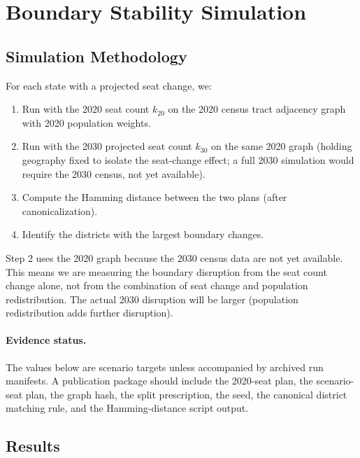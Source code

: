 \section{Boundary Stability Simulation}
\label{sec:boundary}

\subsection{Simulation Methodology}

For each state with a projected seat change, we:
\begin{enumerate}
\item Run \ar{} with the 2020 seat count $k_{20}$ on the 2020 census
      tract adjacency graph with 2020 population weights.
\item Run \ar{} with the 2030 projected seat count $k_{30}$ on the same
      2020 graph (holding geography fixed to isolate the seat-change effect;
      a full 2030 simulation would require the 2030 census, not yet available).
\item Compute the Hamming distance between the two plans (after canonicalization).
\item Identify the districts with the largest boundary changes.
\end{enumerate}

Step 2 uses the 2020 graph because the 2030 census data are not yet available.
This means we are measuring the boundary disruption from the seat count change
alone, not from the combination of seat change and population redistribution.
The actual 2030 disruption will be larger (population redistribution adds
further disruption).

\paragraph{Evidence status.}
The values below are scenario targets unless accompanied by archived run
manifests.  A publication package should include the 2020-seat plan, the
scenario-seat plan, the graph hash, the split prescription, the seed, the
canonical district matching rule, and the Hamming-distance script output.

\subsection{Results}

